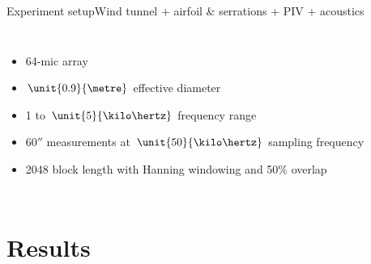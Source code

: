 \documentclass[xcolor=table,aspectratio=169]{beamer}
\begin{document}
\begin{frame}{Experiment setup}{Wind tunnel + airfoil \& serrations + PIV + \alert{acoustics}}

    \begin{columns}
        \vspace{-1.5cm}
        \centering
    
        \vspace{1cm}
        \begin{itemize}
            \item 64-mic array
            \item $\unit{0.9}{\metre}$ effective diameter
            \item 1 to $\unit{5}{\kilo\hertz}$ frequency range
            \item $\unit{60}{\second}$ measurements at $\unit{50}{\kilo\hertz}$ sampling frequency
            \item 2048 block length with Hanning windowing and 50\% overlap
        \end{itemize}

    \end{columns}

\end{frame}

\section{Results}
\CurrentSection
\end{document}
